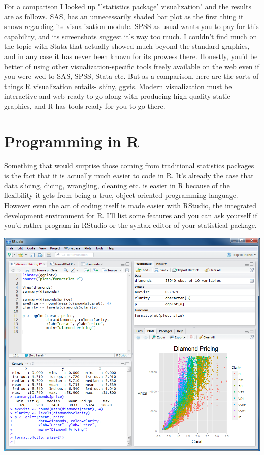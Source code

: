 \documentclass[english,nohyper,titlepage]{tufte-handout}\usepackage[]{graphicx}\usepackage[]{color}
\begin{document}
For a comparison I looked up "'statistics package' visualization" and the results are as follows.  SAS, has an \href{http://www.sas.com/en_us/insights/big-data/data-visualization.html}{unnecessarily shaded bar plot} as the first thing it shows regarding its visualization module.  SPSS as usual wants you to pay for this capability, and its \href{http://www-03.ibm.com/software/products/en/spss-viz-designer}{screenshots} suggest it's way too much.  I couldn't find much on the topic with Stata that actually showed much beyond the standard graphics, and in any case it has never been known for its prowess there.  Honestly, you'd be better of using other visualization-specific tools freely available on the web even if you were wed to SAS, SPSS, Stata etc.  But as a comparison, here are the sorts of things R visualization entails- \href{http://shiny.rstudio.com/gallery/}{shiny}, \href{http://ggvis.rstudio.com/interactivity.html}{ggvis}.  Modern visualization must be interactive and web ready to go along with producing high quality static graphics, and R has tools ready for you to go there.








\part{Programming in R}
Something that would surprise those coming from traditional statistics packages is the fact that it is actually much easier to code in R.  It's already the case that data slicing, dicing, wrangling, cleaning etc. is easier in R because of the flexibility it gets from being a true, object-oriented programming language.  However even the act of coding itself is made easier with RStudio, the integrated development environment for R.  I'll list some features and you can ask yourself if you'd rather program in RStudio or the syntax editor of your statistical package.

\includegraphics[scale=.25]{rstudio}
\end{document}
